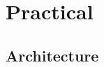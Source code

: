 \documentclass[../bachelor_paper.tex]{subfiles}
\begin{document}
\chapter{Practical}
	\label{ch:prac}
\section{Architecture}
	\label{ch:prac/arch}

\isstandalone



\fi
\end{document}
